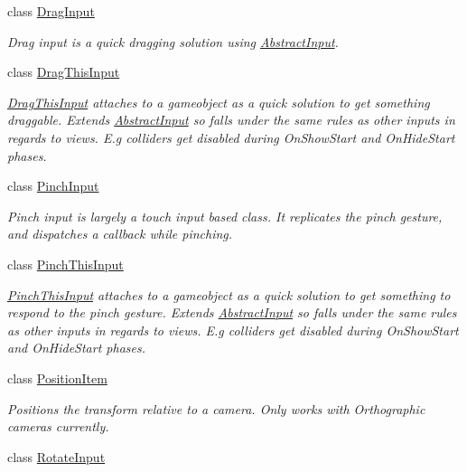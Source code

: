 \begin{DoxyCompactItemize}
class \hyperlink{class_scaffolding_1_1_drag_input}{Drag\-Input}
\begin{DoxyCompactList}\small\item\em Drag input is a quick dragging solution using \hyperlink{class_scaffolding_1_1_abstract_input}{Abstract\-Input}. \end{DoxyCompactList}\item 
class \hyperlink{class_scaffolding_1_1_drag_this_input}{Drag\-This\-Input}
\begin{DoxyCompactList}\small\item\em \hyperlink{class_scaffolding_1_1_drag_this_input}{Drag\-This\-Input} attaches to a gameobject as a quick solution to get something draggable. Extends \hyperlink{class_scaffolding_1_1_abstract_input}{Abstract\-Input} so falls under the same rules as other inputs in regards to views. E.\-g colliders get disabled during On\-Show\-Start and On\-Hide\-Start phases. \end{DoxyCompactList}\item 
class \hyperlink{class_scaffolding_1_1_pinch_input}{Pinch\-Input}
\begin{DoxyCompactList}\small\item\em Pinch input is largely a touch input based class. It replicates the pinch gesture, and dispatches a callback while pinching. \end{DoxyCompactList}\item 
class \hyperlink{class_scaffolding_1_1_pinch_this_input}{Pinch\-This\-Input}
\begin{DoxyCompactList}\small\item\em \hyperlink{class_scaffolding_1_1_pinch_this_input}{Pinch\-This\-Input} attaches to a gameobject as a quick solution to get something to respond to the pinch gesture. Extends \hyperlink{class_scaffolding_1_1_abstract_input}{Abstract\-Input} so falls under the same rules as other inputs in regards to views. E.\-g colliders get disabled during On\-Show\-Start and On\-Hide\-Start phases. \end{DoxyCompactList}\item 
class \hyperlink{class_scaffolding_1_1_position_item}{Position\-Item}
\begin{DoxyCompactList}\small\item\em Positions the transform relative to a camera. Only works with Orthographic cameras currently. \end{DoxyCompactList}\item 
class \hyperlink{class_scaffolding_1_1_rotate_input}{Rotate\-Input}

\end{DoxyCompactItemize}
